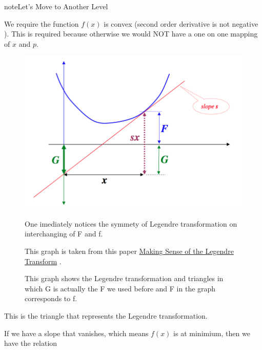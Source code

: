 \documentclass[letterpaper,10pt,english]{sphinxmanual}
\begin{document}
\begin{notice}{note}{Let's Move to Another Level}

We require the function \(f(x)\) is convex (second order derivative is not negative ). This is required because otherwise we would NOT have a one on one mapping of \(x\) and \(p\).
\begin{figure}[htbp]
\centering
\capstart

\includegraphics{legendreTransformation2.png}
\caption{This graph shows the Legendre transformation and triangles in which G is actually the F we used before and F in the graph corresponds to f.}{\small 
One imediately notices the symmety of Legendre transformation on interchanging of F and f.

This graph is taken from this paper \href{http://arxiv.org/abs/0806.1147}{Making Sense of the Legendre Transform} .
}\end{figure}

This is the triangle that represents the Legendre transformation.

If we have a slope that vanishes, which means \(f(x)\) is at minimium, then we have the relation
\end{notice}
\end{document}
